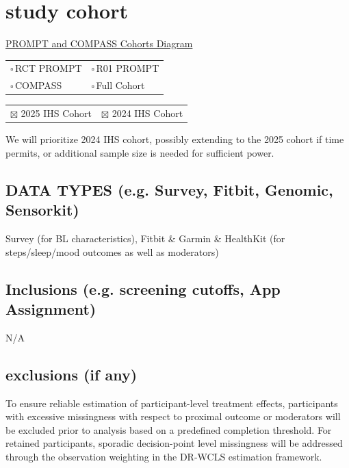 \documentclass[11pt,letterpaper]{article}
\newcommand{\cbox}{$\square$\,}
\begin{document}
\section{study cohort}
\href{https://www.dropbox.com/scl/fi/spwvotejph8oate2o8gll/PROMPT-and-COMPASS-Cohorts.pdf?rlkey=a1qa334mzxthlmv7gvrv1jiot&st=2ajkh0xm&dl=0}%
     {\color{compassblue}PROMPT and COMPASS Cohorts Diagram}

\medskip
\begin{tabular}{@{}p{2.2in}p{2.2in}@{}}
  \cbox RCT PROMPT & \cbox R01 PROMPT   \\[10pt]
  \cbox COMPASS    & \cbox Full Cohort
\end{tabular}

\medskip
\begin{tabular}{@{}p{2.2in}p{2.2in}@{}}
  $\boxtimes$ 2025 IHS Cohort & $\boxtimes$ 2024 IHS Cohort   \\[10pt]
\end{tabular}

We will prioritize 2024 IHS cohort, possibly extending to the 2025 cohort if time permits,
or additional sample size is needed for sufficient power.

\subsection{DATA TYPES (e.g. Survey, Fitbit, Genomic, Sensorkit)}
Survey (for BL characteristics), Fitbit \& Garmin \& HealthKit (for steps/sleep/mood outcomes as well as moderators)

\subsection{Inclusions (e.g. screening cutoffs, App Assignment)}
N/A

\subsection{exclusions (if any)}
To ensure reliable estimation of participant-level treatment effects, participants with excessive missingness with respect to proximal outcome or moderators will be excluded prior to analysis based on a predefined completion threshold.
For retained participants, sporadic decision-point level missingness will be addressed through the observation weighting in the DR-WCLS estimation framework.
\end{document}
